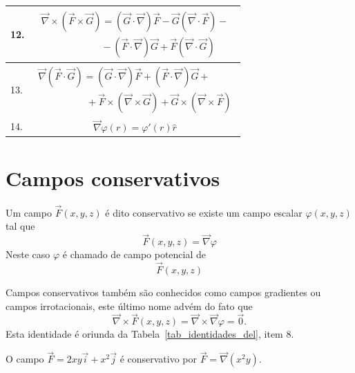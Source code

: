 \begin{table}
\begin{tabular}{|l|c|}
\hline
12.&$\displaystyle\begin{array}{l}\vec{\nabla}\times\left( \vec{F}\times \vec{G}\right)=\left(\vec{G}\cdot \vec{\nabla}\right)\vec{F}-\vec{G}\left(\vec{\nabla}\cdot \vec{F}\right)-\\ ~\qquad\qquad\qquad-\left(\vec{F}\cdot \vec{\nabla}\right)\vec{G}+\vec{F}\left(\vec{\nabla}\cdot \vec{G}\right)\end{array}$\\
\hline
13.&$\displaystyle\begin{array}{l}\vec{\nabla}\left( \vec{F}\cdot \vec{G}\right)=\left(\vec{G}\cdot \vec{\nabla}\right)\vec{F}+\left(\vec{F}\cdot \vec{\nabla}\right)\vec{G}+\\\qquad\qquad\quad+\vec{F}\times\left(\vec{\nabla} \times \vec{G}\right)+\vec{G}\times\left(\vec{\nabla} \times \vec{F}\right)\end{array}$\\
\hline
14.&$\vec{\nabla}\varphi(r) = \varphi'(r)\hat{r}$\\
\hline
\end{tabular}
\end{table}




\section{Campos conservativos}
\begin{defn} \label{def_campo_conservativo}  Um campo $\vec{F}(x,y,z)$ é dito conservativo se existe um campo escalar $\varphi(x,y,z)$ tal que
$$\vec{F}(x,y,z) = \vec{\nabla}\varphi$$
Neste caso $\varphi$ é chamado de campo potencial de $$\vec{F}(x,y,z)$$
\end{defn}
\begin{obs} Campos conservativos também são conhecidos como campos gradientes ou campos irrotacionais, este último nome advém do fato que $$\vec{\nabla}\times\vec{F}(x,y,z) = \vec{\nabla}\times\vec{\nabla}\varphi=\vec{0}.$$
Esta identidade é oriunda da Tabela~\ref{tab_identidades_del}, item 8.
 \end{obs}
\begin{ex} O campo $\vec{F}=2xy\vec{i}+x^2\vec{j}$ é conservativo por $\vec{F}=\vec{\nabla}\left(x^2y\right)$.
 \end{ex}

